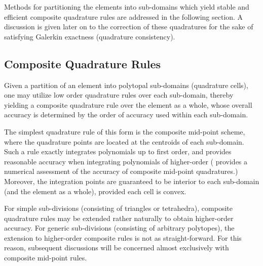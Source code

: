 Methods for partitioning the elements into sub-domains which yield stable and efficient composite quadrature rules are addressed in the following section. A discussion is given later on to the correction of these quadratures for the sake of satisfying Galerkin exactness (quadrature consistency).
		
	\subsection*{Composite Quadrature Rules}
	
	Given a partition of an element into polytopal sub-domains (quadrature cells), one may utilize low order quadrature rules over each sub-domain, thereby yielding a composite quadrature rule over the element as a whole, whose overall accuracy is determined by the order of accuracy used within each sub-domain.
	
	The simplest quadrature rule of this form is the composite mid-point scheme, where the quadrature points are located at the centroids of each sub-domain. Such a rule exactly integrates polynomials up to first order, and provides reasonable accuracy when integrating polynomials of higher-order (\cite{Rashid:12} provides a numerical assessment of the accuracy of composite mid-point quadratures.) Moreover, the integration points are guaranteed to be interior to each sub-domain (and the element as a whole), provided each cell is convex.
	
	For simple sub-divisions (consisting of triangles or tetrahedra), composite quadrature rules may be extended rather naturally to obtain higher-order accuracy. For generic sub-divisions (consisting of arbitrary polytopes), the extension to higher-order composite rules is not as straight-forward. For this reason, subsequent discussions will be concerned almost exclusively with composite mid-point rules.
	
